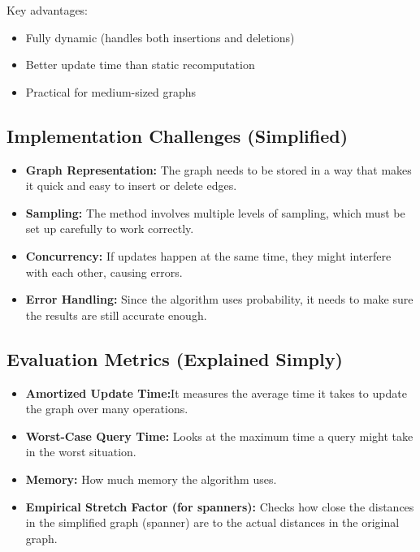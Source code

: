 \documentclass{report}
\begin{document}
Key advantages:
\begin{itemize}
    \item Fully dynamic (handles both insertions and deletions)
    \item Better update time than static recomputation
    \item Practical for medium-sized graphs
\end{itemize}

\subsection*{Implementation Challenges (Simplified)}
\begin{itemize}
    \item \textbf{Graph Representation:} The graph needs to be stored in a way that makes it quick and easy to insert or delete edges.
    \item \textbf{Sampling:} The method involves multiple levels of sampling, which must be set up carefully to work correctly.
    \item \textbf{Concurrency:} If updates happen at the same time, they might interfere with each other, causing errors.
    \item \textbf{Error Handling:} Since the algorithm uses probability, it needs to make sure the results are still accurate enough.
\end{itemize}

\subsection*{Evaluation Metrics (Explained Simply)}
\begin{itemize}
    \item \textbf{Amortized Update Time:}It measures the average time it takes to update the graph over many operations.
    \item \textbf{Worst-Case Query Time:} Looks at the maximum time a query might take in the worst situation.
    \item \textbf{Memory:} How much memory the algorithm uses.
    \item \textbf{Empirical Stretch Factor (for spanners):} Checks how close the distances in the simplified graph (spanner) are to the actual distances in the original graph.
\end{itemize}
\end{document}
